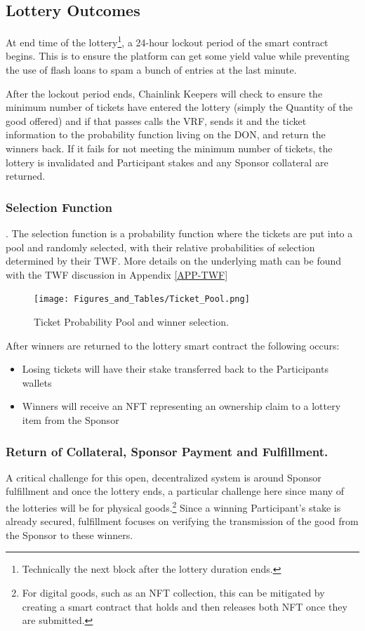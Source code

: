 \documentclass[runningheads]{llncs}
\begin{document}
\subsection{Lottery Outcomes}\label{subsection-LotteryOutcomes}
At end time of the lottery\footnote{Technically the next block after the lottery duration ends.},  a 24-hour lockout period of the smart contract begins.  This is to ensure the platform can get some yield value while preventing the use of flash loans to spam a bunch of entries at the last minute. 

After the lockout period ends, Chainlink Keepers will check to ensure the minimum number of tickets have entered the lottery (simply the Quantity of the good offered) and if that passes calls the VRF, sends it and the ticket information to the probability function living on the DON, and return the winners back.   If it fails for not meeting the minimum number of tickets, the lottery is invalidated and Participant stakes and any Sponsor collateral are returned.   

\subsubsection{Selection Function}.  The selection function is a probability function where the tickets are put into a pool and randomly selected, with their relative probabilities of selection determined by their TWF.  More details on the underlying math can be found with the TWF discussion in Appendix \ref{APP-TWF}

\begin{figure}[H]
\centering
\texttt{[image: Figures\_and\_Tables/Ticket\_Pool.png]}
\caption{Ticket Probability Pool and winner selection.}
\end{figure}

\noindent After winners are returned to the lottery smart contract the following occurs:
\begin{itemize}
\item Losing tickets will have their stake transferred back to the Participants wallets
\item Winners will receive an NFT representing an ownership claim to a lottery item from the Sponsor
\end{itemize}

\subsubsection{Return of Collateral, Sponsor Payment and Fulfillment.}  A critical challenge for this open, decentralized system is around Sponsor fulfillment and once the lottery ends, a particular challenge here since many of the lotteries will be for physical goods.\footnote{For digital goods, such as an NFT collection, this can be mitigated by creating a smart contract that holds and then releases both NFT once they are submitted.}   Since a winning Participant’s stake is already secured, fulfillment focuses on verifying the transmission of the good from the Sponsor to these winners.
\end{document}
